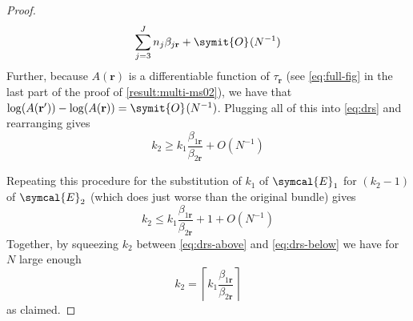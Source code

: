\documentclass{fancyArticle}
\providecommand{\E}{\symcal{E}}             %
\renewcommand{\|}{\,|\,}                    %
\providecommand{\;}{\,;}                    %
\renewcommand{\O}{\symit{O}\:\!}            %
\begin{document}
\begin{appendix}
\begin{proof}
\begin{align*}
             \sum_{j=3}^{J}n_j\beta_{j\mathbf{r}} + \O(N^{-1})
    \end{align*}
    Further, because $A(\mathbf{r})$ is a differentiable function of $\tau_{\mathbf{r}}$ (see \autoref{eq:full-fig} in the last part of the proof of \autoref{result:multi-ms02}), we have that $\log(A(\mathbf{r}'))-\log(A(\mathbf{r}))=\O(N^{-1})$.
    Plugging all of this into \ref{eq:drs} and rearranging gives
    \begin{equation}\label{eq:drs-above}
      k_2 \geq
      k_1\frac{\beta_{1\mathbf{r}}}{\beta_{2\mathbf{r}}} + O(N^{-1})
    \end{equation}

    Repeating this procedure for the substitution of $k_1$ of $\E_1$ for $(k_2-1)$ of $\E_2$ (which does just worse than the original bundle) gives
    \begin{equation}\label{eq:drs-below}
      k_2 \leq
      k_1\frac{\beta_{1\mathbf{r}}}{\beta_{2\mathbf{r}}} + 1 + O(N^{-1})
    \end{equation}
    Together, by squeezing $k_2$ between \ref{eq:drs-above} and \ref{eq:drs-below} we have for $N$ large enough
    \begin{equation*}
      k_2 = \left\lceil k_1 \frac{\beta_{1\mathbf{r}}}
        {\beta_{2\mathbf{r}}}\right\rceil
    \end{equation*}
    as claimed.
  \end{proof}

\end{appendix}

\pagebreak

\end{document}

